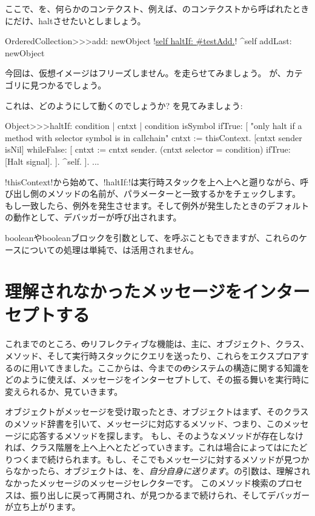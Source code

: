 \documentclass[a4paper,10pt,twoside]{book}
\begin{document}
ここで、を、何らかのコンテクスト、例えば、のコンテクストから呼ばれたときにだけ、haltさせたいとしましょう。

\begin{code}{}
OrderedCollection>>>add: newObject
	!\underline{self haltIf: \#testAdd.}!
	^self addLast: newObject
\end{code}

今回は、仮想イメージはフリーズしません。を走らせてみましょう。
が、カテゴリに見つかるでしょう。

これは、どのようにして動くのでしょうか? を見てみましょう:
\begin{code}{}
Object>>>haltIf: condition
	| cntxt |
	condition isSymbol ifTrue: [
		"only halt if a method with selector symbol is in callchain"
		cntxt := thisContext.
		[cntxt sender isNil] whileFalse: [
			cntxt := cntxt sender. 
			(cntxt selector = condition) ifTrue: [Halt signal]. ].
		^self.
	].
	...
\end{code}

\ct!thisContext!から始めて、\ct!haltIf:!は実行時スタックを上へ上へと遡りながら、呼び出し側のメソッドの名前が、パラメーターと一致するかをチェックします。
もし一致したら、例外を発生させます。そして例外が発生したときのデフォルトの動作として、デバッガーが呼び出されます。

booleanやbooleanブロックを引数として、を呼ぶこともできますが、これらのケースについての処理は単純で、は活用されません。

\section{理解されなかったメッセージをインターセプトする}

これまでのところ、\st のリフレクティブな機能は、主に、オブジェクト、クラス、メソッド、そして実行時スタックにクエリを送ったり、これらをエクスプロアするのに用いてきました。ここからは、今までの\st のシステムの構造に関する知識をどのように使えば、メッセージをインターセプトして、その振る舞いを実行時に変えられるか、見ていきます。

オブジェクトがメッセージを受け取ったとき、オブジェクトはまず、そのクラスのメソッド辞書を引いて、メッセージに対応するメソッド、つまり、このメッセージに応答するメソッドを探します。
もし、そのようなメソッドが存在しなければ、クラス階層を上へ上へとたどっていきます。これは場合によってはにたどりつくまで続けられます。もし、そこでもメッセージに対するメソッドが見つからなかったら、オブジェクトは、を、\emph{自分自身に送ります}。の引数は、理解されなかったメッセージのメッセージセレクターです。 %
このメソッド検索のプロセスは、振り出しに戻って再開され、が見つかるまで続けられ、そしてデバッガーが立ち上がります。
\end{document}
